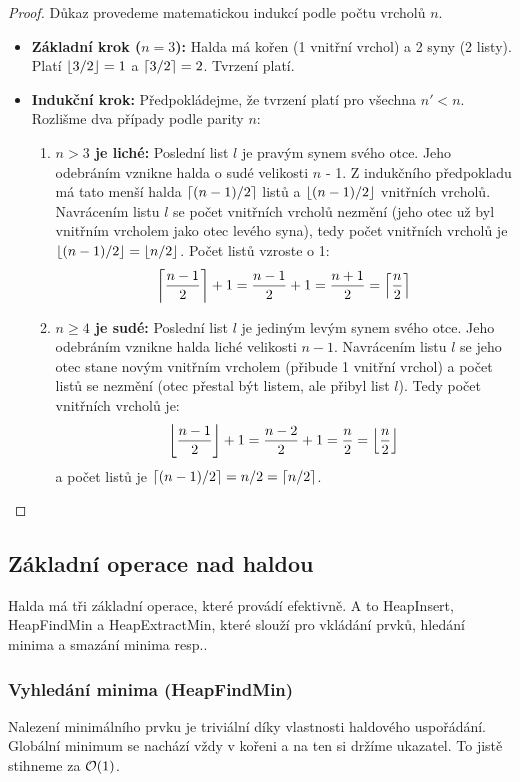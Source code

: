 \begin{proof}
Důkaz provedeme matematickou indukcí podle počtu vrcholů $n$.
\begin{itemize}
    \item \textbf{Základní krok ($n = 3$):} Halda má kořen (1 vnitřní vrchol) a 2 syny (2 listy). Platí $\left\lfloor3/2\right\rfloor = 1$ a $\left\lceil3/2\right\rceil = 2$. Tvrzení platí.
    \item \textbf{Indukční krok:} Předpokládejme, že tvrzení platí pro všechna $n' < n$. Rozlišme dva případy podle parity $n$:
    \begin{enumerate}
        \item \textbf{$n > 3$ je liché:} Poslední list $l$ je pravým synem svého otce. Jeho odebráním vznikne halda o sudé velikosti $n$ - 1. Z indukčního předpokladu má tato menší halda $\left\lceil(n-1)/2\right\rceil$ listů a $\left\lfloor(n-1)/2\right\rfloor$ vnitřních vrcholů. Navrácením listu $l$ se počet vnitřních vrcholů nezmění (jeho otec už byl vnitřním vrcholem jako otec levého syna), tedy počet vnitřních vrcholů je $\left\lfloor(n-1)/2\right\rfloor = \left\lfloor n/2\right\rfloor$. Počet listů vzroste o 1:
        $$\left\lceil\frac{n-1}{2}\right\rceil + 1 = \frac{n-1}{2} + 1 = \frac{n+1}{2} = \left\lceil\frac{n}{2}\right\rceil$$
        \item \textbf{$n \ge 4$ je sudé:} Poslední list $l$ je jediným levým synem svého otce. Jeho odebráním vznikne halda liché velikosti $n - 1$. Navrácením listu $l$ se jeho otec stane novým vnitřním vrcholem (přibude 1 vnitřní vrchol) a počet listů se nezmění (otec přestal být listem, ale přibyl list $l$). Tedy počet vnitřních vrcholů je:
        $$\left\lfloor\frac{n-1}{2}\right\rfloor + 1 = \frac{n-2}{2} + 1 = \frac{n}{2} = \left\lfloor\frac{n}{2}\right\rfloor$$
        a počet listů je $\left\lceil(n-1)/2\right\rceil = n/2 = \left\lceil n/2\right\rceil$.
    \end{enumerate}
\end{itemize}
\end{proof}

\newpage

\subsection{Základní operace nad haldou}

Halda má tři základní operace, které provádí efektivně. A to HeapInsert, HeapFindMin a HeapExtractMin, které slouží pro vkládání prvků, hledání minima a smazání minima resp.. \bigskip

\subsubsection{Vyhledání minima (HeapFindMin)}
Nalezení minimálního prvku je triviální díky vlastnosti haldového uspořádání. Globální minimum se nachází vždy v kořeni a na ten si držíme ukazatel. To jistě stihneme za $\mathcal{O}(1)$. \bigskip

